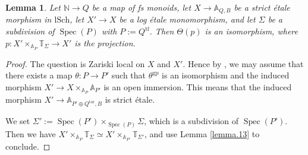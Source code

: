 \documentclass[10pt]{amsart}
\newtheorem{lem}[thm]{Lemma}
\theoremstyle{definition}
\theoremstyle{remark}
\numberwithin{equation}{subsection}
\newcommand{\A}{\mathbb{A}}
\newcommand{\N}{\mathbb{N}}
\newcommand{\T}{\mathbb{T}}
\DeclareMathOperator{\Spec}{Spec}
\newcommand{\tor}{\mathrm{tor}}
\newcommand{\tf}{\mathrm{tf}}
\newcommand{\lSch}{\mathrm{lSch}}
\newcommand{\gp}{\mathrm{gp}}
\begin{document}
\begin{lem}
\label{lemma.12}
Let $\N\to Q$ be a map of fs monoids, let $X\to \A_{Q,B}$ be a strict \'etale morphism in $\lSch$, let $X'\to X$ be a log \'etale monomorphism, and let $\Sigma$ be a subdivision of $\Spec(P)$ with $P:=Q^\tf$.
Then $\Theta(p)$ is an isomorphism, where $p\colon X'\times_{\A_{P}}\T_{\Sigma}\to X'$ is the projection.
\end{lem}
\begin{proof}
The question is Zariski local on $X$ and $X'$.
Hence by \cite[Lemma A.11.3]{logDM}, we may assume that there exists a map $\theta\colon P\to P'$ such that $\theta^\gp$ is an isomorphism and the induced morphism $X'\to X\times_{\A_P}\A_{P'}$ is an open immersion.
This means that the induced morphism $X'\to \A_{P'\oplus Q^{\tor},B}$ is strict \'etale.

We set $\Sigma':=\Spec(P')\times_{\Spec(P)}\Sigma$, which is a subdivision of $\Spec(P')$.
Then we have $X'\times_{\A_{P}}\T_{\Sigma}\simeq X'\times_{\A_{P'}}\T_{\Sigma'}$, and use Lemma \ref{lemma.13} to conclude.
\end{proof}
\end{document}
